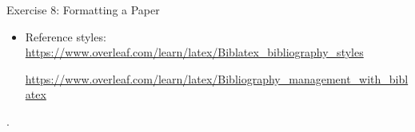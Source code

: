 \documentclass[10pt,times]{beamer}
\begin{document}
\begin{frame}[fragile]{Exercise 8: Formatting a Paper}

\begin{center}
  
\end{center}

\begin{itemize}

\item Reference styles: 
\href{https://www.overleaf.com/learn/latex/Biblatex_bibliography_styles}{https://www.overleaf.com/learn/latex/Biblatex\_bibliography\_styles}

\href{https://www.overleaf.com/learn/latex/Bibliography_management_with_biblatex}{https://www.overleaf.com/learn/latex/Bibliography\_management\_with\_biblatex}

\end{itemize}

\begin{center}
%
.
\end{center}

\end{frame}


\end{document}
